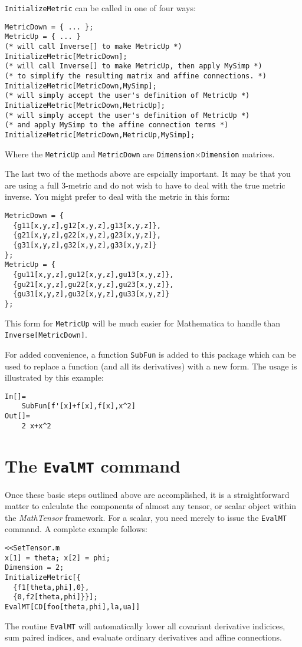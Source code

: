 {\tt InitializeMetric} can be called in one of four ways:
\begin{verbatim}
MetricDown = { ... };
MetricUp = { ... }
(* will call Inverse[] to make MetricUp *)
InitializeMetric[MetricDown];
(* will call Inverse[] to make MetricUp, then apply MySimp *)
(* to simplify the resulting matrix and affine connections. *)
InitializeMetric[MetricDown,MySimp];
(* will simply accept the user's definition of MetricUp *)
InitializeMetric[MetricDown,MetricUp];
(* will simply accept the user's definition of MetricUp *)
(* and apply MySimp to the affine connection terms *)
InitializeMetric[MetricDown,MetricUp,MySimp];
\end{verbatim}
Where the {\tt MetricUp} and {\tt MetricDown} are
{\tt Dimension}$\times${\tt Dimension} matrices.

The last two of the methods above are espcially important.  It
may be that you are using a full 3-metric and do not wish
to have to deal with the true metric inverse.  You might
prefer to deal with the metric in this form:
\begin{verbatim}
MetricDown = {
  {g11[x,y,z],g12[x,y,z],g13[x,y,z]},
  {g21[x,y,z],g22[x,y,z],g23[x,y,z]},
  {g31[x,y,z],g32[x,y,z],g33[x,y,z]}
};
MetricUp = {
  {gu11[x,y,z],gu12[x,y,z],gu13[x,y,z]},
  {gu21[x,y,z],gu22[x,y,z],gu23[x,y,z]},
  {gu31[x,y,z],gu32[x,y,z],gu33[x,y,z]}
};
\end{verbatim}
This form for {\tt MetricUp} will be much easier for
Mathematica to handle than {\tt Inverse[MetricDown]}.

For added convenience, a function {\tt SubFun} is added
to this package which can be used to replace a function
(and all its derivatives) with a new form.  The usage
is illustrated by this example:
\begin{verbatim}
In[]=
    SubFun[f'[x]+f[x],f[x],x^2]
Out[]=
    2 x+x^2
\end{verbatim}

\section{The {\tt EvalMT} command}
Once these basic steps outlined above are accomplished,
it is a straightforward
matter to calculate the components of almost any tensor, or
scalar object within the {\it MathTensor} framework.  For a scalar, you need
merely to issue the {\tt EvalMT} command.  A complete example follows:
\begin{verbatim}
<<SetTensor.m
x[1] = theta; x[2] = phi;
Dimension = 2;
InitializeMetric[{
  {f1[theta,phi],0},
  {0,f2[theta,phi]}}];
EvalMT[CD[foo[theta,phi],la,ua]]
\end{verbatim}
The routine {\tt EvalMT} will automatically lower all covariant
derivative indicices, sum paired indices, and evaluate ordinary
derivatives and affine connections.

